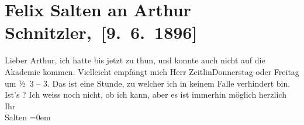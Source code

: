 

         
         \renewcommand{\erwaehntePersonen}{Personen: Felix Salten, Alexander Zeitlin}
         \renewcommand{\erwaehnteInstitutionen}{Institutionen: Akademie der Bildenden Künste Wien}
         \renewcommand{\erwaehnteOrte}{Orte: Burgtheater, Wien}
         \renewcommand{\erwaehnteWerke}{}
               \section[ Felix Salten an Arthur Schnitzler, {[}9. 6. 1896{]}]{ Felix Salten an Arthur Schnitzler, {[}9. 6. 1896{]}}\nopagebreak{}\rehead{ }\begin{ledgroupsized}[t]{13cm}\normalsize\beginnumbering{} \toendnotes[C]{\smallbreak\pagebreak[2]} 
\toendnotes[C]{\smallbreak}\pstart
           \noindent{}{\pb}Lieber Arthur, ich hatte bis jetzt zu thun, und konnte
               auch nicht auf die Akademie kommen. Vielleicht
               empfängt mich Herr ZeitlinDonnerstag oder Freitag
               um ½ 3 – 3. Das ist eine Stunde, zu welcher ich in keinem Falle
               verhindert bin. Ist’s \label{K_L03172-1v}\label{K_L03172-1h}? Ich weiss noch nicht, ob ich kann, aber es ist immerhin möglich\pend
           \pstart
           herzlich Ihr {\\[\baselineskip]}\spacefill\mbox{Salten}\pend
           \leftskip=0em{}
         
         \endnumbering{}\end{ledgroupsized}  \newcommand{\dateiname}{L03172}\newcommand{\titel}{Felix Salten an Arthur Schnitzler, [9. 6. 1896]}\newcommand{\editorInnen}{Martin Anton Müller und Laura Untner}
      